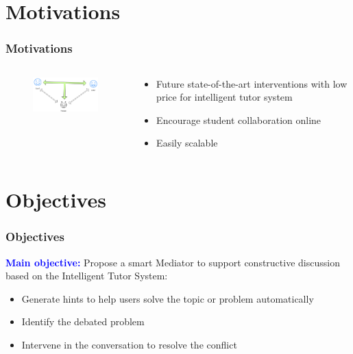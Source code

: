 \documentclass{beamer}
\begin{document}
\section{Motivations} %
\begin{frame}
\frametitle{Motivations}
\begin{columns}
	\begin{column}{.55\textwidth}
		\begin{figure}
			\includegraphics[width=55mm]{m1.png}
		\end{figure}

	\end{column}
	
	\begin{column}{.55\textwidth}
		\begin{itemize}
			\item Future state-of-the-art interventions with low price for intelligent tutor system
			\item Encourage student collaboration online
			\item Easily scalable 
		
			
		\end{itemize}
	\end{column}
\end{columns}
\end{frame}


\section{Objectives} %
\begin{frame}
\frametitle{Objectives}
{\large \textcolor{blue}{\textbf{Main objective:}}} Propose a smart Mediator to support constructive discussion based on the Intelligent Tutor System:

\begin{itemize}
	\item Generate hints to help users solve the topic or problem automatically
	\item    Identify the debated problem
	\item Intervene in the conversation to resolve the conflict
\end{itemize}

\end{frame}
\end{document}
